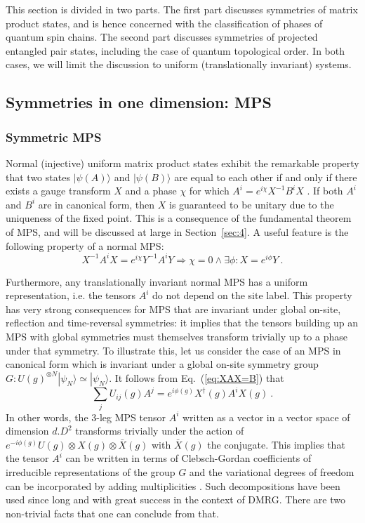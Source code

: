 \documentclass[rmp,aps,reprint,superscriptaddress,nobalancelastpage]{revtex4-1}
\newcommand{\be}{\begin{equation}}
\newcommand{\ee}{\end{equation}}
\begin{document}
This section is divided in two parts. The first part discusses symmetries of matrix product states, and is hence concerned with the classification of phases of quantum spin chains. The second part discusses symmetries of projected entangled pair states, including the case of quantum topological order. In both cases, we will limit the discussion to uniform (translationally invariant) systems.



\subsection{Symmetries in one dimension: MPS}
\subsubsection{Symmetric MPS \label{sec:3:sym}}

Normal (injective) uniform matrix product states exhibit the remarkable property that two states $|\psi(A)\rangle$ and $|\psi(B)\rangle$ are equal to each other if and only if there exists a gauge transform $X$ and a phase $\chi$ for which $A^i=e^{i\chi}X^{-1}B^iX$ \cite{perez-garcia:stringorder-1d}. If both $A^i$ and $B^i$ are in canonical form, then $X$ is guaranteed to be unitary due to the uniqueness of the fixed point. This is a consequence of the fundamental theorem of MPS, and will be discussed at large in Section~\ref{sec:4}. A useful feature is the following property of a normal MPS:
\be X^{-1}A^iX=e^{i\chi}Y^{-1}A^iY\Rightarrow \chi=0\land\exists\phi: X=e^{i\phi}Y \ .
    \label{eq:XAX=B}\ee

Furthermore, any translationally invariant normal MPS has a uniform representation, i.e. the tensors $A^i$ do not depend on the site label. This property has very strong consequences for MPS that are invariant under global on-site, reflection and time-reversal symmetries: it implies that the tensors building up an MPS with global symmetries must themselves transform trivially up to a phase
under that symmetry. To illustrate this, let us consider the case of an MPS  in canonical form which  is invariant under a global on-site symmetry group $G : U(g)^{\otimes N}|\psi_N\rangle\simeq |\psi_N\rangle$. It follows from Eq.~(\ref{eq:XAX=B}) that
\be \sum_{j}U_{ij}(g)A^j=e^{i\phi(g)}X^{\dagger}(g)A^iX(g)\ . \ee
In other words, the 3-leg MPS tensor $A^i$ written as a vector in a vector
space of dimension $d.D^2$ transforms  trivially under the action of
$e^{-i\phi(g)}U(g)\otimes X(g)\otimes \bar{X}(g)$ with $\bar{X}(g)$ the
conjugate. This implies that the tensor $A^i$ can be written in terms of
Clebsch-Gordan coefficients of irreducible representations of the group
$G$ and the variational degrees of freedom can be incorporated by adding
multiplicities \cite{mcculloch2002non,singh:tns-decomp-symmetry,sanz:mps-syms,weichselbaum2012non,white1993density}.
Such decompositions have been used since long and with great success in the context of DMRG. There are two non-trivial facts that one can conclude from that.
\end{document}
